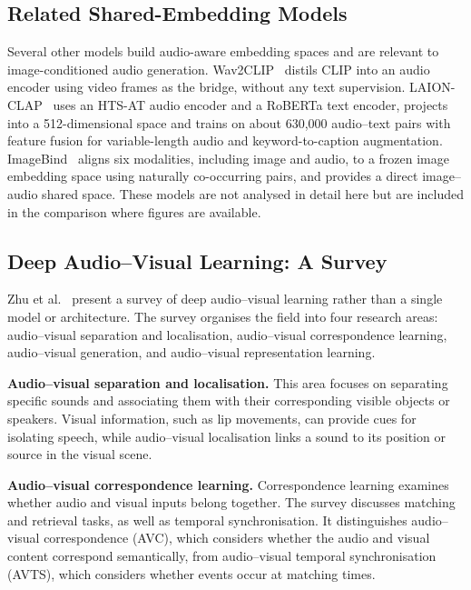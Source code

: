 \documentclass[pdflatex,sn-mathphys-num]{sn-jnl}%
\theoremstyle{thmstyleone}%
\theoremstyle{thmstyletwo}%
\theoremstyle{thmstylethree}%
\begin{document}
\subsection{Related Shared-Embedding Models}\label{subsec4.4}

Several other models build audio-aware embedding spaces and are relevant to image-conditioned audio generation. Wav2CLIP~\cite{wu2022wav2clip} distils CLIP into an audio encoder using video frames as the bridge, without any text supervision. LAION-CLAP~\cite{wu2023laionclap} uses an HTS-AT audio encoder and a RoBERTa text encoder, projects into a 512-dimensional space and trains on about 630,000 audio--text pairs with feature fusion for variable-length audio and keyword-to-caption augmentation. ImageBind~\cite{girdhar2023imagebind} aligns six modalities, including image and audio, to a frozen image embedding space using naturally co-occurring pairs, and provides a direct image--audio shared space. These models are not analysed in detail here but are included in the comparison where figures are available.

\subsection{Deep Audio--Visual Learning: A Survey}\label{subsec4.5}

Zhu et al.~\cite{zhu2021deepav} present a survey of deep audio--visual learning rather than a single model or architecture. The survey organises the field into four research areas: audio--visual separation and localisation, audio--visual correspondence learning, audio--visual generation, and audio--visual representation learning.

\textbf{Audio--visual separation and localisation.} This area focuses on separating specific sounds and associating them with their corresponding visible objects or speakers. Visual information, such as lip movements, can provide cues for isolating speech, while audio--visual localisation links a sound to its position or source in the visual scene.

\textbf{Audio--visual correspondence learning.} Correspondence learning examines whether audio and visual inputs belong together. The survey discusses matching and retrieval tasks, as well as temporal synchronisation. It distinguishes audio--visual correspondence (AVC), which considers whether the audio and visual content correspond semantically, from audio--visual temporal synchronisation (AVTS), which considers whether events occur at matching times.
\end{document}
